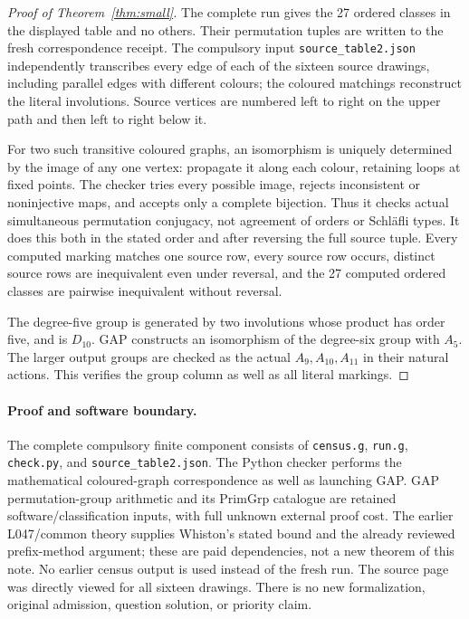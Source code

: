\documentclass[11pt,a4paper]{article}
\begin{document}
\begin{proof}[Proof of Theorem~\ref{thm:small}]
The complete run gives the 27 ordered classes in the displayed
table and no others. Their permutation tuples are written to the
fresh correspondence receipt. The compulsory input
\texttt{source\_table2.json} independently transcribes every edge
of each of the sixteen source drawings, including parallel edges
with different colours; the coloured matchings reconstruct the
literal involutions. Source vertices are numbered left to right
on the upper path and then left to right below it.

For two such transitive coloured graphs, an isomorphism is uniquely
determined by the image of any one vertex: propagate it along
each colour, retaining loops at fixed points. The checker tries
every possible image, rejects inconsistent or noninjective maps,
and accepts only a complete bijection. Thus it checks actual
simultaneous permutation conjugacy, not agreement of orders or
Schl\"afli types. It does this both in the stated order and after
reversing the full source tuple. Every computed marking matches
one source row, every source row occurs, distinct source rows are
inequivalent even under reversal, and the 27 computed ordered
classes are pairwise inequivalent without reversal.

The degree-five group is generated by two involutions whose product
has order five, and is $D_{10}$. GAP constructs an isomorphism of
the degree-six group with $A_5$. The larger output groups are
checked as the actual $A_9,A_{10},A_{11}$ in their natural actions.
This verifies the group column as well as all literal markings.
\end{proof}

\paragraph{Proof and software boundary.}
The complete compulsory finite component consists of
\texttt{census.g}, \texttt{run.g}, \texttt{check.py}, and
\texttt{source\_table2.json}. The Python checker performs the
mathematical coloured-graph correspondence as well as launching
GAP. GAP permutation-group arithmetic and its PrimGrp catalogue
are retained software/classification inputs, with full unknown
external proof cost. The earlier L047/common theory supplies
Whiston's stated bound and the already reviewed prefix-method
argument; these are paid dependencies, not a new theorem of this
note. No earlier census output is used instead of the fresh run.
The source page was directly viewed for all sixteen drawings.
There is no new formalization, original admission, question
solution, or priority claim.
\end{document}
